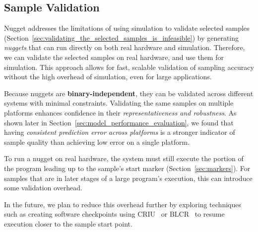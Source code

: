 \subsection{Sample Validation}\label{sec:verification}

Nugget addresses the limitations of using simulation to validate selected samples (Section~\ref{sec:validating_the_selected_samples_is_infeasible}) by generating \emph{nuggets} that can run directly on both real hardware and simulation.
Therefore, we can validate the selected samples on real hardware, and use them for simulation.
This approach allows for fast, scalable validation of sampling accuracy without the high overhead of simulation, even for large applications.

Because nuggets are \textbf{binary-independent}, they can be validated across different systems with minimal constraints. 
Validating the same samples on multiple platforms enhances confidence in their \emph{representativeness and robustness}. 
As shown later in Section~\ref{sec:model_performance_evaluation}, we found that having \emph{consistent prediction error across platforms} is a stronger indicator of sample quality than achieving low error on a single platform.

To run a nugget on real hardware, the system must still execute the portion of the program leading up to the sample's start marker (Section~\ref{sec:markers}).
For samples that are in later stages of a large program's execution, this can introduce some validation overhead. 

In the future, we plan to reduce this overhead further by exploring techniques such as creating software checkpoints using CRIU~\cite{CRIU} or BLCR~\cite{BLCR} to resume execution closer to the sample start point.
